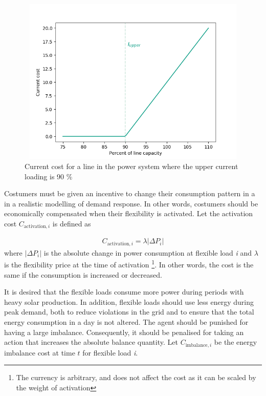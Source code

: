 \documentclass[class=book, crop=false, 11pt]{standalone}
\begin{document}
\begin{figure}[ht]
    \center
\includegraphics[height=8cm, width=12cm]{figures/current_cost.png}
    \caption[size = 9]{Current cost for a line in the power system where the upper current loading is 90 \%}
    \label{fig:problem:current_cost}
\end{figure}
Costumers must be given an incentive to change their consumption pattern in a in a realistic modelling of demand response. In other words, costumers should be economically compensated when their flexibility is activated. Let the activation cost $C_{\textrm{activation},i}$ is defined as

\begin{equation}
   \begin{aligned}
   \label{eq:problem:activation_cost}
    C_{\textrm{activation},i} = \lambda |\Delta P_{i}|
    \end{aligned} 
\end{equation}
where $|\Delta P_{i}|$  is the absolute change in power consumption at flexible load \textit{i} and $\lambda$ is the flexibility price at the time of activation \footnote{The currency is arbitrary, and does not affect the cost as it can be scaled by the weight of activation}. In other words, the cost is the same if the consumption is increased or decreased.

It is desired that the flexible loads consume more power during periods with heavy solar production. In addition, flexible loads should use less energy during peak demand, both to reduce violations in the grid and to ensure that the total energy consumption in a day is not altered. The agent should be punished for having a large imbalance. Consequently, it should be penalised for taking an action that increases the absolute balance quantity. Let $C_{\textrm{imbalance},i}$ be the energy imbalance cost at time $t$ for flexible load \textit{i}.
\end{document}
